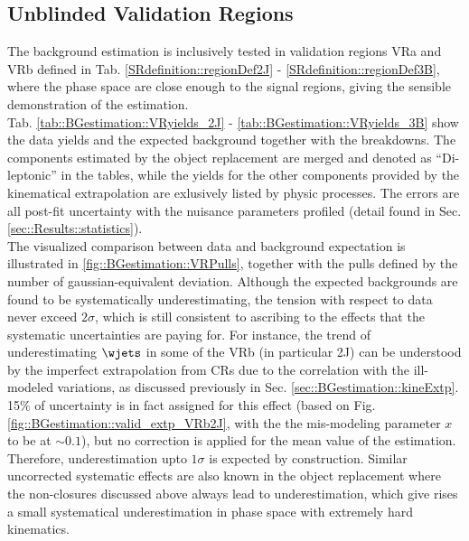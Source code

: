 \clearpage
\subsection{Unblinded Validation Regions}
The background estimation is inclusively tested in validation regions VRa and VRb defined in Tab. \ref{SRdefinition::regionDef2J} - \ref{SRdefinition::regionDef3B},
where the phase space are close enough to the signal regions, giving the sensible demonstration of the estimation. \\

Tab. \ref{tab::BGestimation::VRyields_2J} - \ref{tab::BGestimation::VRyields_3B} show the data yields and the expected background together with the breakdowns. 
The components estimated by the object replacement are merged and denoted as ``Di-leptonic'' in the tables, 
while the yields for the other components provided by the kinematical extrapolation are exlusively listed by physic processes. 
The errors are all post-fit uncertainty with the nuisance parameters profiled (detail found in Sec. \ref{sec::Results::statistics}). \\

The visualized comparison between data and background expectation is illustrated in \ref{fig::BGestimation::VRPulls}, together with the pulls defined by the number of gaussian-equivalent deviation. 
Although the expected backgrounds are found to be systematically underestimating, the tension with respect to data never exceed $2\sigma$, which is still consistent to ascribing to the effects that the systematic uncertainties are paying for.
For instance, the trend of underestimating $\wjets$ in some of the VRb (in particular 2J) can be understood by the imperfect extrapolation from CRs due to the correlation with the ill-modeled variations, as discussed previously in Sec. \ref{sec::BGestimation::kineExtp}. 15$\%$ of uncertainty is in fact assigned for this effect (based on Fig. \ref{fig::BGestimation::valid_extp_VRb2J}, with the the mis-modeling parameter $x$ to be at $\sim0.1$), but no correction is applied for the mean value of the estimation. Therefore, underestimation upto $1\sigma$ is expected by construction. Similar uncorrected systematic effects are also known in the object replacement where the non-closures discussed above always lead to underestimation, which give rises a small systematical underestimation in phase space with extremely hard kinematics.


\clearpage


